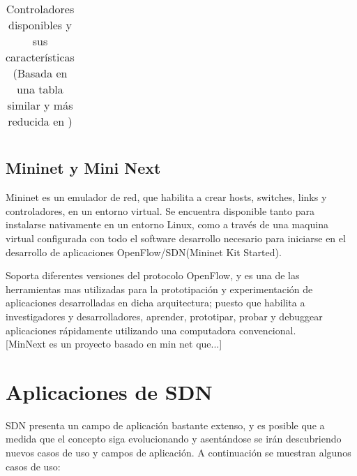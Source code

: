 \begin{table}[!htbp]
\begin{tabular}{|l|l|l|p{2cm}|l|p{6cm}|}
\hline   
\end{tabular}
\caption{Controladores disponibles y sus características (Basada en una tabla similar y más reducida en \cite{StateOfArt1})}
\label{table:Controladores}
\end{table}

\subsection{Mininet y Mini Next}
Mininet\cite{Mininet1} es un emulador de red, que habilita a crear hosts, switches, links y controladores, en un entorno virtual. Se encuentra disponible tanto para instalarse nativamente en un entorno Linux, como a través de una maquina virtual configurada con todo el software desarrollo necesario para iniciarse en el desarrollo de aplicaciones OpenFlow/SDN(Mininet Kit Started). 

Soporta diferentes versiones del protocolo OpenFlow, y es una de las herramientas mas utilizadas para la prototipaci\'on y experimentación de aplicaciones desarrolladas en dicha arquitectura; puesto que habilita a investigadores y desarrolladores, aprender, prototipar, probar y debuggear aplicaciones rápidamente utilizando una computadora convencional.\\

[MinNext es un proyecto basado en min net que...]

\section{Aplicaciones de SDN}
SDN presenta un campo de aplicación bastante extenso, y es posible que a medida que el concepto siga evolucionando y asentándose se irán descubriendo nuevos casos de uso y campos de aplicación. A continuación se muestran algunos casos de uso:

